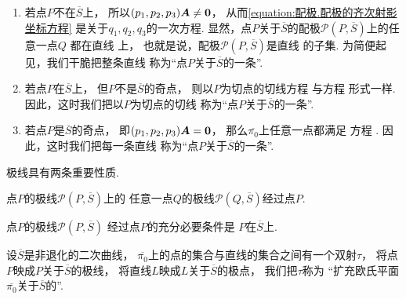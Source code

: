 \begingroup
{}
\begin{enumerate}[label={{\rm\bf 情形}\arabic*.}]
	\item
	若点\(P\)不在\(\overline{S}\)上，
	所以\((p_1,p_2,p_3) \boldsymbol{A} \neq \boldsymbol0\)，
	从而\cref{equation:配极.配极的齐次射影坐标方程}
	是关于\(q_1,q_2,q_3\)的一次方程.
	显然，点\(P\)关于\(\overline{S}\)的配极\(\mathcal{P}(P,\overline{S})\)上的任意一点\(Q\)
	都在直线  上，
	也就是说，配极\(\mathcal{P}(P,\overline{S})\)是直线  的子集.
	为简便起见，我们干脆把整条直线 
	称为“点\(P\)关于\(\overline{S}\)的一条”.

	\item
	若点\(P\)在\(\overline{S}\)上，
	但\(P\)不是\(\overline{S}\)的奇点，
	则以\(P\)为切点的切线方程 
	与方程  形式一样.
	因此，这时我们把以\(P\)为切点的切线
	称为“点\(P\)关于\(\overline{S}\)的一条”.

	\item
	若点\(P\)是\(\overline{S}\)的奇点，
	即\((p_1,p_2,p_3) \boldsymbol{A} = \boldsymbol0\)，
	那么\(\overline{\pi_0}\)上任意一点都满足
	方程 .
	因此，这时我们把每一条直线
	称为“点\(P\)关于\(\overline{S}\)的一条”.
\end{enumerate}
\endgroup

极线具有两条重要性质.
\begin{property}
点\(P\)的极线\(\mathcal{P}(P,\overline{S})\)上的
任意一点\(Q\)的极线\(\mathcal{P}(Q,\overline{S})\)经过点\(P\).
\end{property}

\begin{property}
点\(P\)的极线\(\mathcal{P}(P,\overline{S})\)
经过点\(P\)的充分必要条件是
\(P\)在\(\overline{S}\)上.
\end{property}

\begin{definition}
设\(\overline{S}\)是非退化的二次曲线，
\(\overline{\pi_0}\)上的点的集合与直线的集合之间有一个双射\(\tau\)，
将点\(P\)映成\(P\)关于\(\overline{S}\)的极线，
将直线\(L\)映成\(L\)关于\(\overline{S}\)的极点，
我们把\(\tau\)称为
“扩充欧氏平面\(\overline{\pi_0}\)关于\(\overline{S}\)的”.
\end{definition}

